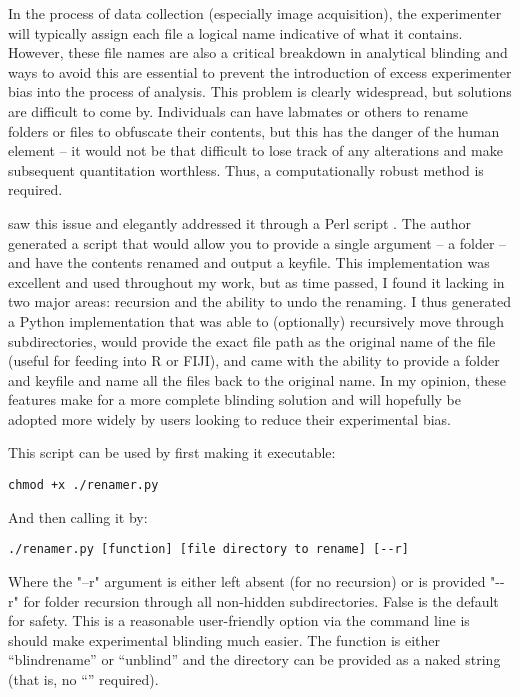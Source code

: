 In the process of data collection (especially image acquisition), the experimenter will typically assign each file a logical name indicative of what it contains. However, these file names are also a critical breakdown in analytical blinding and ways to avoid this are essential to prevent the introduction of excess experimenter bias into the process of analysis. This problem is clearly widespread, but solutions are difficult to come by. Individuals can have labmates or others to rename folders or files to obfuscate their contents, but this has the danger of the human element -- it would not be that difficult to lose track of any alterations and make subsequent quantitation worthless. Thus, a computationally robust method is required. 

\citet{Salter2016} saw this issue and elegantly addressed it through a Perl script \citep{Wall2000}. The author generated a script that would allow you to provide a single argument -- a folder -- and have the contents renamed and output a keyfile. This implementation was excellent and used throughout my work, but as time passed, I found it lacking in two major areas: recursion and the ability to undo the renaming. I thus generated a Python implementation that was able to (optionally) recursively move through subdirectories, would provide the exact file path as the original name of the file (useful for feeding into R or FIJI), and came with the ability to provide a folder and keyfile and name all the files back to the original name. In my opinion, these features make for a more complete blinding solution and will hopefully be adopted more widely by users looking to reduce their experimental bias.

This script can be used by first making it executable:

\begin{code}
\begin{verbatim}
chmod +x ./renamer.py
\end{verbatim}
\end{code}

And then calling it by:

\begin{code}
\begin{verbatim}
./renamer.py [function] [file directory to rename] [--r]
\end{verbatim}
\end{code}

Where the "--r" argument is either left absent (for no recursion) or is provided "\hyp{}\hyp{}r" for folder recursion through all non-hidden subdirectories. False is the default for safety. This is a reasonable user-friendly option via the command line is should make experimental blinding much easier. The function is either ``blindrename'' or ``unblind'' and the directory can be provided as a naked string (that is, no ``'' required).


